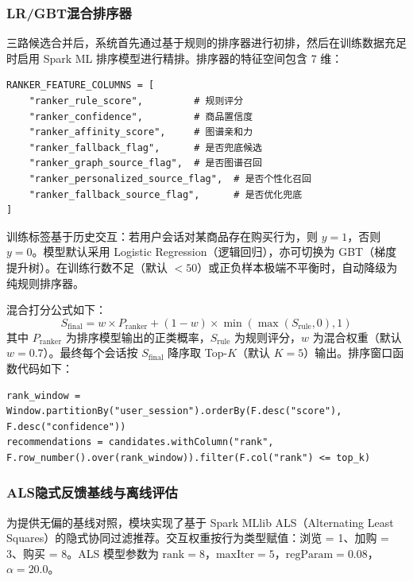 \subsubsection{LR/GBT混合排序器}

三路候选合并后，系统首先通过基于规则的排序器进行初排，然后在训练数据充足时启用 Spark ML 排序模型进行精排。排序器的特征空间包含 7 维：

\begin{lstlisting}[style=codexcode]
RANKER_FEATURE_COLUMNS = [
    "ranker_rule_score",         # 规则评分
    "ranker_confidence",         # 商品置信度
    "ranker_affinity_score",     # 图谱亲和力
    "ranker_fallback_flag",      # 是否兜底候选
    "ranker_graph_source_flag",  # 是否图谱召回
    "ranker_personalized_source_flag",  # 是否个性化召回
    "ranker_fallback_source_flag",      # 是否优化兜底
]
\end{lstlisting}

训练标签基于历史交互：若用户会话对某商品存在购买行为，则 $y=1$，否则 $y=0$。模型默认采用 Logistic Regression（逻辑回归），亦可切换为 GBT（梯度提升树）。在训练行数不足（默认 $<50$）或正负样本极端不平衡时，自动降级为纯规则排序器。

混合打分公式如下：
\begin{equation}
    S_{\text{final}} = w \times P_{\text{ranker}} + (1 - w) \times \min\left(\max(S_{\text{rule}}, 0), 1\right)
    \label{eq:blended-score}
\end{equation}
其中 $P_{\text{ranker}}$ 为排序模型输出的正类概率，$S_{\text{rule}}$ 为规则评分，$w$ 为混合权重（默认 $w=0.7$）。最终每个会话按 $S_{\text{final}}$ 降序取 Top-$K$（默认 $K=5$）输出。排序窗口函数代码如下：
\begin{lstlisting}[style=codexcode]
rank_window = Window.partitionBy("user_session").orderBy(F.desc("score"), F.desc("confidence"))
recommendations = candidates.withColumn("rank", F.row_number().over(rank_window)).filter(F.col("rank") <= top_k)
\end{lstlisting}

\subsubsection{ALS隐式反馈基线与离线评估}

为提供无偏的基线对照，模块实现了基于 Spark MLlib ALS（Alternating Least Squares）的隐式协同过滤推荐。交互权重按行为类型赋值：浏览 = 1、加购 = 3、购买 = 8。ALS 模型参数为 $\text{rank}=8$，$\text{maxIter}=5$，$\text{regParam}=0.08$，$\alpha=20.0$。

